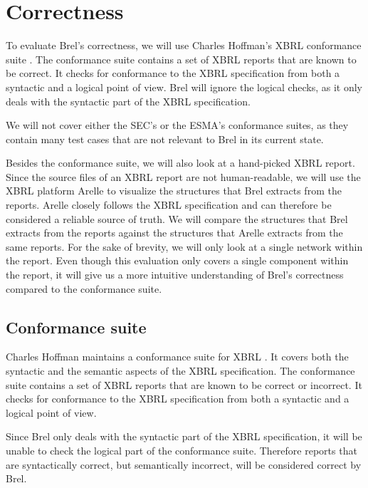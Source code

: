 \section{Correctness}
\label{sec:correctness}

To evaluate Brel's correctness, we will use Charles Hoffman's XBRL conformance suite \cite{hoffman_conformance_suite}.
The conformance suite contains a set of XBRL reports that are known to be correct.
It checks for conformance to the XBRL specification from both a syntactic and a logical point of view.
Brel will ignore the logical checks, as it only deals with the syntactic part of the XBRL specification.

We will not cover either the SEC's or the ESMA's conformance suites, 
as they contain many test cases that are not relevant to Brel in its current state.

Besides the conformance suite, we will also look at a hand-picked XBRL report.
Since the source files of an XBRL report are not human-readable, 
we will use the XBRL platform Arelle\cite{arelle} to visualize the structures that Brel extracts from the reports.
Arelle closely follows the XBRL specification and can therefore be considered a reliable source of truth.
We will compare the structures that Brel extracts from the reports against the structures that Arelle extracts from the same reports.
For the sake of brevity, we will only look at a single network within the report.
Even though this evaluation only covers a single component within the report,
it will give us a more intuitive understanding of Brel's correctness compared to the conformance suite.

\subsection{Conformance suite}

Charles Hoffman maintains a conformance suite for XBRL \cite{hoffman_conformance_suite}.
It covers both the syntactic and the semantic aspects of the XBRL specification.
The conformance suite contains a set of XBRL reports that are known to be correct or incorrect.
It checks for conformance to the XBRL specification from both a syntactic and a logical point of view.

Since Brel only deals with the syntactic part of the XBRL specification, 
it will be unable to check the logical part of the conformance suite.
Therefore reports that are syntactically correct, but semantically incorrect, will be considered correct by Brel.

